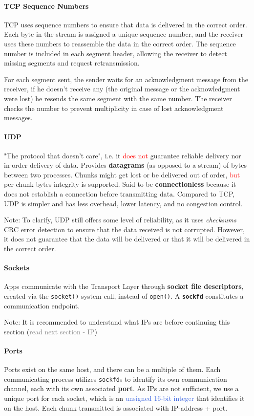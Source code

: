 \documentclass[openany,12pt]{book}
\newcommand{\code}[1]{\texttt{#1}}
\newcommand{\red}[1]{\textcolor{Red}{#1}}
\newcommand{\blue}[1]{\textcolor{RoyalBlue}{#1}}
\newcommand{\gray}[1]{\textcolor{gray}{#1}}
\begin{document}
\paragraph{TCP Sequence Numbers} TCP uses sequence numbers to ensure that data is delivered in the correct order. Each byte in the stream is assigned a unique sequence number, and the receiver uses these numbers to reassemble the data in the correct order. The sequence number is included in each segment header, allowing the receiver to detect missing segments and request retransmission. 

For each segment sent, the sender waits for an acknowledgment message from the receiver, if he doesn't receive any (the original message or the acknowledgment were lost) he resends the same segment with the same number. The receiver checks the number to prevent multiplicity in case of lost acknowledgment messages.

\paragraph{UDP} "The protocol that doesn't care", i.e. it \red{does not} guarantee reliable delivery nor in-order delivery of data. Provides \textbf{datagrams} (as opposed to a stream) of bytes between two processes. Chunks might get lost or be delivered out of order, \red{but} per-chunk bytes integrity is supported. Said to be \textbf{connectionless} because it does not establish a connection before transmitting data. Compared to TCP, UDP is simpler and has less overhead, lower latency, and no congestion control.

Note: To clarify, UDP still offers some level of reliability, as it uses \textit{checksums} CRC error detection to ensure that the data received is not corrupted. However, it does not guarantee that the data will be delivered or that it will be delivered in the correct order.

\paragraph{Sockets} Apps communicate with the Transport Layer through \textbf{socket file descriptors}, created via the \code{socket()} system call, instead of \code{open()}. A \textbf{\code{sockfd}} constitutes a communication endpoint.

Note: It is recommended to understand what IPs are before continuing this section (\gray{read next section - IP})

\paragraph{Ports} Ports exist on the same host, and there can be a multiple of them. Each communicating process utilizes \code{sockfd}s to identify its own communication channel, each with its own associated \textbf{port}. As IPs are not sufficient, we use a unique port for each socket, which is an \blue{unsigned 16-bit integer} that identifies it on the host. Each chunk transmitted is associated with IP-address + port.
\end{document}
